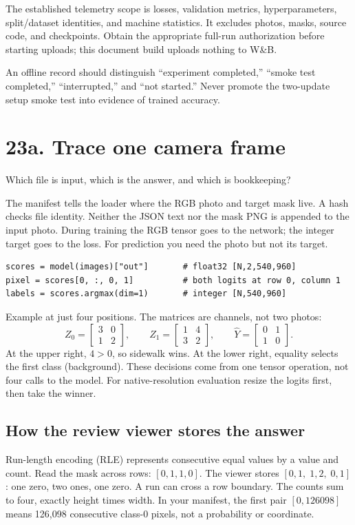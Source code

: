 \documentclass[11pt,letterpaper]{article}
\newcommand{\note}[1]{\par\vspace{3pt}\begingroup\setlength{\fboxsep}{8pt}%
 \colorbox{pale}{\parbox{\dimexpr\linewidth-2\fboxsep\relax}{#1}}\endgroup\par\vspace{3pt}}
\newcommand{\guidepage}[2]{\clearpage\pdfbookmark[0]{#1}{guide-\thepage}\section*{#1}{\sffamily\color{muted}#2}\par\vspace{5pt}}
\begin{document}
The established telemetry scope is losses, validation metrics, hyperparameters, split/dataset identities, and machine statistics. It excludes photos, masks, source code, and checkpoints. Obtain the appropriate full-run authorization before starting uploads; this document build uploads nothing to W\&B.

\note{An offline record should distinguish ``experiment completed,'' ``smoke test completed,'' ``interrupted,'' and ``not started.'' Never promote the two-update setup smoke test into evidence of trained accuracy.}

\guidepage{23a. Trace one camera frame}{Which file is input, which is the answer, and which is bookkeeping?}
The manifest tells the loader where the RGB photo and target mask live. A hash checks file identity. Neither the JSON text nor the mask PNG is appended to the input photo. During training the RGB tensor goes to the network; the integer target goes to the loss. For prediction you need the photo but not its target.

\begin{lstlisting}
scores = model(images)["out"]       # float32 [N,2,540,960]
pixel = scores[0, :, 0, 1]          # both logits at row 0, column 1
labels = scores.argmax(dim=1)       # integer [N,540,960]
\end{lstlisting}
Example at just four positions. The matrices are channels, not two photos:
\[
 Z_0=\begin{bmatrix}3&0\\1&2\end{bmatrix},\qquad
 Z_1=\begin{bmatrix}1&4\\3&2\end{bmatrix},\qquad
 \widehat Y=\begin{bmatrix}0&1\\1&0\end{bmatrix}.
\]
At the upper right, $4>0$, so sidewalk wins. At the lower right, equality selects the first class (background). These decisions come from one tensor operation, not four calls to the model. For native-resolution evaluation resize the logits first, then take the winner.

\subsection*{How the review viewer stores the answer}
Run-length encoding (RLE) represents consecutive equal values by a value and count. Read the mask across rows: $[0,1,1,0]$. The viewer stores $[0,1,\;1,2,\;0,1]$: one zero, two ones, one zero. A run can cross a row boundary. The counts sum to four, exactly height times width. In your manifest, the first pair $[0,126098]$ means 126,098 consecutive class-0 pixels, not a probability or coordinate.
\end{document}
